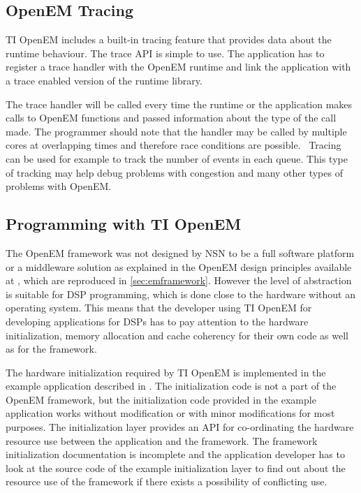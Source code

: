 \subsection{OpenEM Tracing}
\label{subsec:ti-tracing}
TI OpenEM includes a built-in tracing feature that provides data about the runtime behaviour. The trace API is simple to use. The application has to register a trace handler with the OpenEM runtime and link the application with a trace enabled version of the runtime library.~\cite{openemapi}

The trace handler will be called every time the runtime or the application makes calls to OpenEM functions and passed information about the type of the call made. The programmer should note that the handler may be called by multiple cores at overlapping times and therefore race conditions are possible.~\cite{openemapi} Tracing can be used for example to track the number of events in each queue. This type of tracking may help debug problems with congestion and many other types of problems with OpenEM.

\subsection{Programming with TI OpenEM}
\label{subsec:ti-init-layer}
The OpenEM framework was not designed by NSN to be a full software platform or a middleware solution as explained in the OpenEM design principles available at \cite{openempage}, which are reproduced in \ref{sec:emframework}. However the level of abstraction is suitable for DSP programming, which is done close to the hardware without an operating system. This means that the developer using TI OpenEM for developing applications for DSPs has to pay attention to the hardware initialization, memory allocation and cache coherency for their own code as well as for the framework.~\cite{openemuser}

The hardware initialization required by TI OpenEM is implemented in the example application described in \cite{openemuser}. The initialization code is not a part of the OpenEM framework, but the initialization code provided in the example application works without modification or with minor modifications for most purposes. The initialization layer provides an API for co-ordinating the hardware resource use between the application and the framework. \cite{openemuser} The framework initialization documentation is incomplete and the application developer has to look at the source code of the example initialization layer to find out about the resource use of the framework if there exists a possibility of conflicting use.


